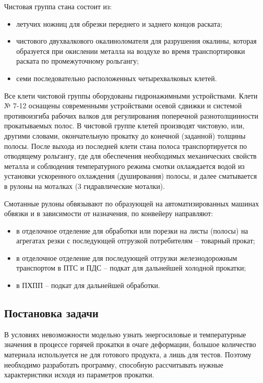 Чистовая группа стана состоит из:

\begin{itemize}
\item летучих ножниц для обрезки переднего и заднего концов раската;
\item чистового двухвалкового окалиноломателя для разрушения окалины, которая образуется при окислении металла на воздухе во время транспортировки раската по промежуточному рольгангу;
\item семи последовательно расположенных четырехвалковых клетей.
\end{itemize}

Все клети чистовой группы оборудованы гидронажимными устройствами. Клети № 7-12 оснащены современными устройствами осевой сдвижки и системой противоизгиба рабочих валков для регулирования поперечной разнотолщинности прокатываемых полос. В чистовой группе клетей производят чистовую, или, другими словами, окончательную прокатку до конечной (заданной) толщины полосы. После выхода из последней клети стана полоса транспортируется по отводящему рольгангу, где для обеспечения необходимых механических свойств металла и соблюдения температурного режима смотки охлаждается водой из установки ускоренного охлаждения (душирования) полосы, и далее сматывается в рулоны на моталках (3 гидравлические моталки).


Смотанные рулоны обвязывают по образующей на автоматизированных машинах обвязки и в зависимости от назначения, по конвейеру направляют:
\begin{itemize}
\item в отделочное отделение для обработки или порезки на листы (полосы) на агрегатах резки с последующей отгрузкой потребителям – товарный прокат;
\item в отделочное отделение для последующей отгрузки железнодорожным транспортом в ПТС и ПДС – подкат для дальнейшей холодной прокатки;
\item в ПХПП – подкат для дальнейшей обработки.
\end{itemize}

\subsection{Постановка задачи}

В условиях невозможности модельно узнать энергосиловые и температурные значения в процессе горячей прокатки в очаге деформации, большое количество материала используется не для готового продукта, а лишь для тестов. Поэтому необходимо разработать программу, способную рассчитывать нужные характеристики исходя из параметров прокатки.

